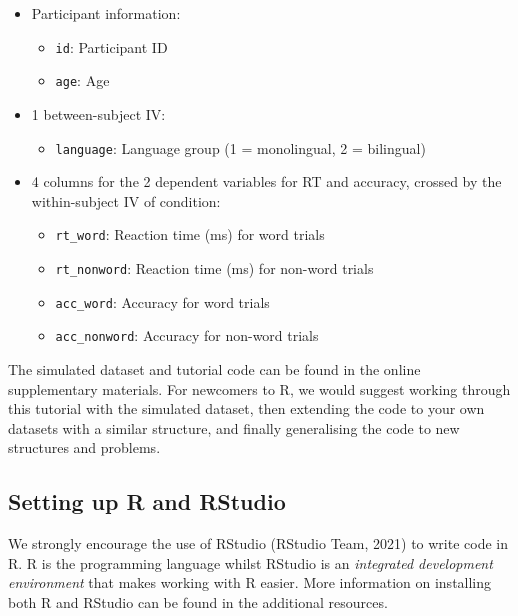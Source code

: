 \documentclass[
  english,
  doc,floatsintext]{apa6}
\providecommand{\tightlist}{%
  \setlength{\itemsep}{0pt}\setlength{\parskip}{0pt}}
\begin{document}
\begin{itemize}
\item
  Participant information:

  \begin{itemize}
  \tightlist
  \item
    \texttt{id}: Participant ID
  \item
    \texttt{age}: Age
  \end{itemize}
\item
  1 between-subject IV:

  \begin{itemize}
  \tightlist
  \item
    \texttt{language}: Language group (1 = monolingual, 2 = bilingual)
  \end{itemize}
\item
  4 columns for the 2 dependent variables for RT and accuracy, crossed by the within-subject IV of condition:

  \begin{itemize}
  \tightlist
  \item
    \texttt{rt\_word}: Reaction time (ms) for word trials
  \item
    \texttt{rt\_nonword}: Reaction time (ms) for non-word trials
  \item
    \texttt{acc\_word}: Accuracy for word trials
  \item
    \texttt{acc\_nonword}: Accuracy for non-word trials
  \end{itemize}
\end{itemize}

The simulated dataset and tutorial code can be found in the online supplementary materials. For newcomers to R, we would suggest working through this tutorial with the simulated dataset, then extending the code to your own datasets with a similar structure, and finally generalising the code to new structures and problems.

\hypertarget{setting-up-r-and-rstudio}{%
\subsection{Setting up R and RStudio}\label{setting-up-r-and-rstudio}}

We strongly encourage the use of RStudio (RStudio Team, 2021) to write code in R. R is the programming language whilst RStudio is an \emph{integrated development environment} that makes working with R easier. More information on installing both R and RStudio can be found in the additional resources.
\end{document}
